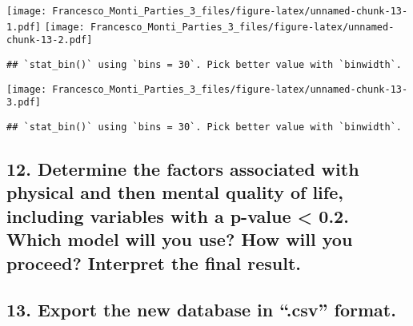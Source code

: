 \documentclass[
]{article}
\begin{document}
\texttt{[image: Francesco\_Monti\_Parties\_3\_files/figure-latex/unnamed-chunk-13-1.pdf]}
\texttt{[image: Francesco\_Monti\_Parties\_3\_files/figure-latex/unnamed-chunk-13-2.pdf]}

\begin{verbatim}
## `stat_bin()` using `bins = 30`. Pick better value with `binwidth`.
\end{verbatim}

\texttt{[image: Francesco\_Monti\_Parties\_3\_files/figure-latex/unnamed-chunk-13-3.pdf]}

\begin{verbatim}
## `stat_bin()` using `bins = 30`. Pick better value with `binwidth`.
\end{verbatim}

\hypertarget{determine-the-factors-associated-with-physical-and-then-mental-quality-of-life-including-variables-with-a-p-value-0.2.-which-model-will-you-use-how-will-you-proceed-interpret-the-final-result.}{%
\subsection{12. Determine the factors associated with physical and then
mental quality of life, including variables with a p-value \textless{}
0.2. Which model will you use? How will you proceed? Interpret the final
result.}\label{determine-the-factors-associated-with-physical-and-then-mental-quality-of-life-including-variables-with-a-p-value-0.2.-which-model-will-you-use-how-will-you-proceed-interpret-the-final-result.}}

\hypertarget{export-the-new-database-in-.csv-format.}{%
\subsection{13. Export the new database in ``.csv''
format.}\label{export-the-new-database-in-.csv-format.}}

\hypertarget{section}{%
\subsection{}\label{section}}
\end{document}
